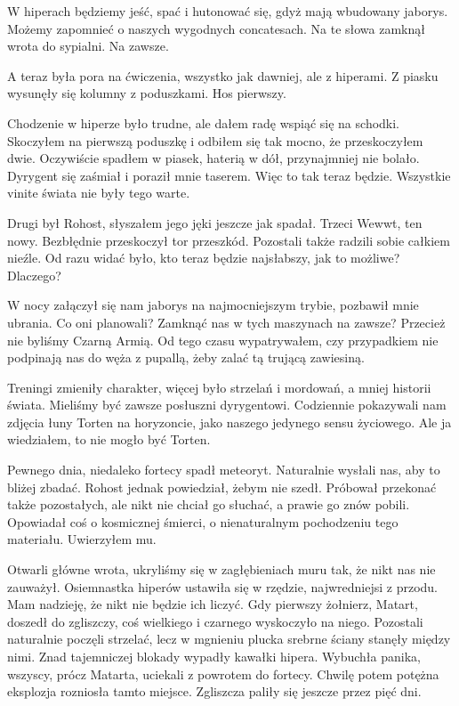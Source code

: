 W hiperach będziemy jeść, spać i hutonować się, gdyż mają wbudowany jaborys.
Możemy zapomnieć o naszych wygodnych concatesach.
Na te słowa zamknął wrota do sypialni. Na zawsze.

A teraz była pora na ćwiczenia, wszystko jak dawniej, ale z hiperami.
Z piasku wysunęły się kolumny z poduszkami.
Hos pierwszy.

Chodzenie w hiperze było trudne, ale dałem radę wspiąć się na schodki.
Skoczyłem na pierwszą poduszkę i odbiłem się tak mocno, że przeskoczyłem dwie.
Oczywiście spadłem w piasek, haterią w dół, przynajmniej nie bolało.
Dyrygent się zaśmiał i poraził mnie taserem. Więc to tak teraz będzie.
Wszystkie vinite świata nie były tego warte.

Drugi był Rohost, słyszałem jego jęki jeszcze jak spadał.
Trzeci Wewwt, ten nowy.
Bezbłędnie przeskoczył tor przeszkód.
Pozostali także radzili sobie całkiem nieźle.
Od razu widać było, kto teraz będzie najsłabszy, jak to możliwe?
Dlaczego?

W nocy załączył się nam jaborys na najmocniejszym trybie, pozbawił mnie ubrania.
Co oni planowali? Zamknąć nas w tych maszynach na zawsze? Przecież nie byliśmy Czarną Armią.
Od tego czasu wypatrywałem, czy przypadkiem nie podpinają nas do węża z pupallą, żeby zalać tą trującą zawiesiną.

Treningi zmieniły charakter, więcej było strzelań i mordowań, a mniej historii świata.
Mieliśmy być zawsze posłuszni dyrygentowi. Codziennie pokazywali nam zdjęcia łuny Torten na horyzoncie, jako naszego jedynego sensu życiowego.
Ale ja wiedziałem, to nie mogło być Torten.

Pewnego dnia, niedaleko fortecy spadł meteoryt.
Naturalnie wysłali nas, aby to bliżej zbadać.
Rohost jednak powiedział, żebym nie szedł. Próbował przekonać także pozostałych, ale nikt nie chciał go słuchać, a prawie go znów pobili.
Opowiadał coś o kosmicznej śmierci, o nienaturalnym pochodzeniu tego materiału.
Uwierzyłem mu.

Otwarli główne wrota, ukryliśmy się w zagłębieniach muru tak, że nikt nas nie zauważył.
Osiemnastka hiperów ustawiła się w rzędzie, najwredniejsi z przodu.
Mam nadzieję, że nikt nie będzie ich liczyć.
Gdy pierwszy żołnierz, Matart, doszedł do zgliszczy, coś wielkiego i czarnego wyskoczyło na niego.
Pozostali naturalnie poczęli strzelać, lecz w mgnieniu plucka srebrne ściany stanęły między nimi.
Znad tajemniczej blokady wypadły kawałki hipera.
Wybuchła panika, wszyscy, prócz Matarta, uciekali z powrotem do fortecy.
Chwilę potem potężna eksplozja rozniosła tamto miejsce.
Zgliszcza paliły się jeszcze przez pięć dni.

